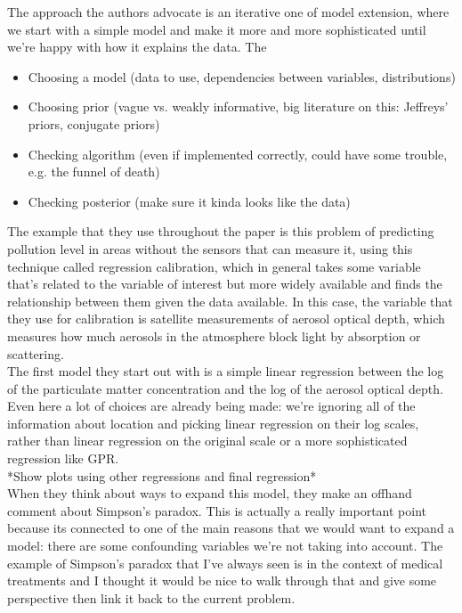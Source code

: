 \documentclass[]{article}
\begin{document}
The approach the authors advocate is an iterative one of model extension, where we start with a simple model and make it more and more sophisticated until we're happy with how it explains the data. The 
\begin{itemize}
	\item Choosing a model (data to use, dependencies between variables, distributions)
	\item Choosing prior (vague vs. weakly informative, big literature on this: Jeffreys' priors, conjugate priors)
	\item Checking algorithm (even if implemented correctly, could have some trouble, e.g. the funnel of death)
	\item Checking posterior (make sure it kinda looks like the data)
\end{itemize}

The example that they use throughout the paper is this problem of predicting pollution level in areas without the sensors that can measure it, using this technique called regression calibration, which in general takes some variable that's related to the variable of interest but more widely available and finds the relationship between them given the data available. In this case, the variable that they use for calibration is satellite measurements of aerosol optical depth, which measures how much aerosols in the atmosphere block light by absorption or scattering.
\\

The first model they start out with is a simple linear regression between the log of the particulate matter concentration and the log of the aerosol optical depth. Even here a lot of choices are already being made: we're ignoring all of the information about location and picking linear regression on their log scales, rather than linear regression on the original scale or a more sophisticated regression like GPR.
\\

*Show plots using other regressions and final regression*
\\

When they think about ways to expand this model, they make an offhand comment about Simpson's paradox. This is actually a really important point because its connected to one of the main reasons that we would want to expand a model: there are some confounding variables we're not taking into account. The example of Simpson's paradox that I've always seen is in the context of medical treatments and I thought it would be nice to walk through that and give some perspective then link it back to the current problem.
\\
\end{document}
